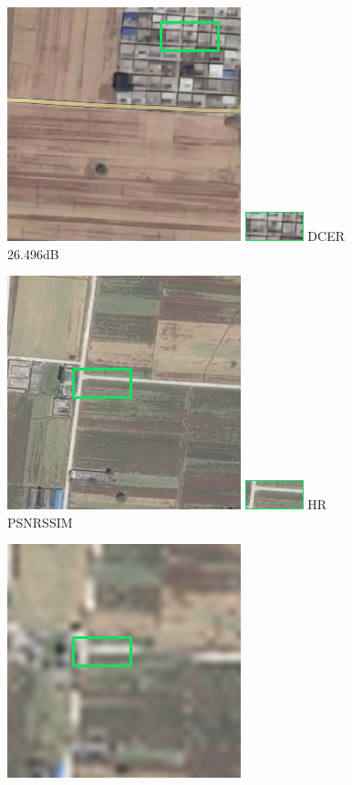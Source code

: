 \documentclass[runningheads,a4paper]{llncs}
\begin{document}
\begin{figure}[htbp]
\begin{minipage}{1.3cm}
    \includegraphics[scale=0.2]{pic/4x/dcer/pick-35.png}
    \includegraphics[scale=0.8]{pic/4x/dcer/small-35.png}
    {DCER \newline26.496dB}
    \end{minipage}
    \qquad
    \begin{minipage}{1.4cm}
    \includegraphics[scale=0.2]{pic/8x/hr/437.png}
    \includegraphics[scale=0.8]{pic/8x/hr/small-437.png}
    {HR \newline PSNR\newline SSIM}
    \end{minipage}
    \qquad
    \begin{minipage}{1.4cm}
    \includegraphics[scale=0.2]{pic/8x/bicu/pick-437.png}

\end{minipage}
\end{figure}
\end{document}
